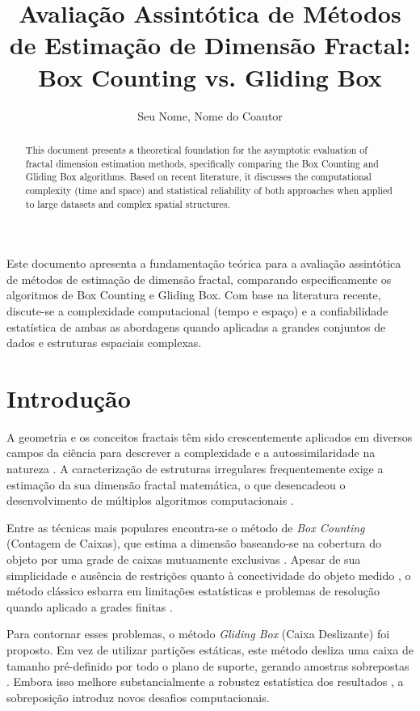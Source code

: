 \documentclass[12pt]{article}
\title{Avaliação Assintótica de Métodos de Estimação de Dimensão Fractal: Box Counting vs. Gliding Box}
\author{Seu Nome\inst{1}, Nome do Coautor\inst{1}}
\begin{document}
 

\maketitle

\begin{abstract}
  This document presents a theoretical foundation for the asymptotic evaluation of fractal dimension estimation methods, specifically comparing the Box Counting and Gliding Box algorithms. Based on recent literature, it discusses the computational complexity (time and space) and statistical reliability of both approaches when applied to large datasets and complex spatial structures.
\end{abstract}
     
\begin{resumo} 
  Este documento apresenta a fundamentação teórica para a avaliação assintótica de métodos de estimação de dimensão fractal, comparando especificamente os algoritmos de Box Counting e Gliding Box. Com base na literatura recente, discute-se a complexidade computacional (tempo e espaço) e a confiabilidade estatística de ambas as abordagens quando aplicadas a grandes conjuntos de dados e estruturas espaciais complexas.
\end{resumo}

\section{Introdução}

A geometria e os conceitos fractais têm sido crescentemente aplicados em diversos campos da ciência para descrever a complexidade e a autossimilaridade na natureza \cite{saa2007}. A caracterização de estruturas irregulares frequentemente exige a estimação da sua dimensão fractal matemática, o que desencadeou o desenvolvimento de múltiplos algoritmos computacionais \cite{gonzato1998}. 

Entre as técnicas mais populares encontra-se o método de \textit{Box Counting} (Contagem de Caixas), que estima a dimensão baseando-se na cobertura do objeto por uma grade de caixas mutuamente exclusivas \cite{saa2007}. Apesar de sua simplicidade e ausência de restrições quanto à conectividade do objeto medido \cite{gonzato1998}, o método clássico esbarra em limitações estatísticas e problemas de resolução quando aplicado a grades finitas \cite{saa2007}. 

Para contornar esses problemas, o método \textit{Gliding Box} (Caixa Deslizante) foi proposto. Em vez de utilizar partições estáticas, este método desliza uma caixa de tamanho pré-definido por todo o plano de suporte, gerando amostras sobrepostas \cite{saa2007}. Embora isso melhore substancialmente a robustez estatística dos resultados \cite{saa2007}, a sobreposição introduz novos desafios computacionais.
\end{document}
